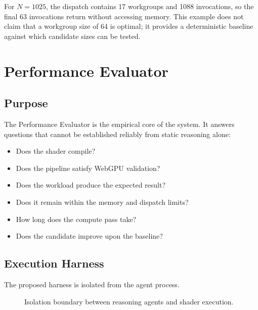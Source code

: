 \documentclass[11pt,a4paper,oneside]{report}
\begin{document}
For $N=1025$, the dispatch contains 17 workgroups and 1088 invocations, so the final 63
invocations return without accessing memory. This example does not claim that a workgroup size of
64 is optimal; it provides a deterministic baseline against which candidate sizes can be tested.

\chapter{Performance Evaluator}

\section{Purpose}

The Performance Evaluator is the empirical core of the system. It answers questions that cannot
be established reliably from static reasoning alone:

\begin{itemize}
  \item Does the shader compile?
  \item Does the pipeline satisfy WebGPU validation?
  \item Does the workload produce the expected result?
  \item Does it remain within the memory and dispatch limits?
  \item How long does the compute pass take?
  \item Does the candidate improve upon the baseline?
\end{itemize}

\section{Execution Harness}

The proposed harness is isolated from the agent process.

\begin{figure}[H]
\centering
{}
\caption{Isolation boundary between reasoning agents and shader execution.}
\end{figure}
\end{document}
